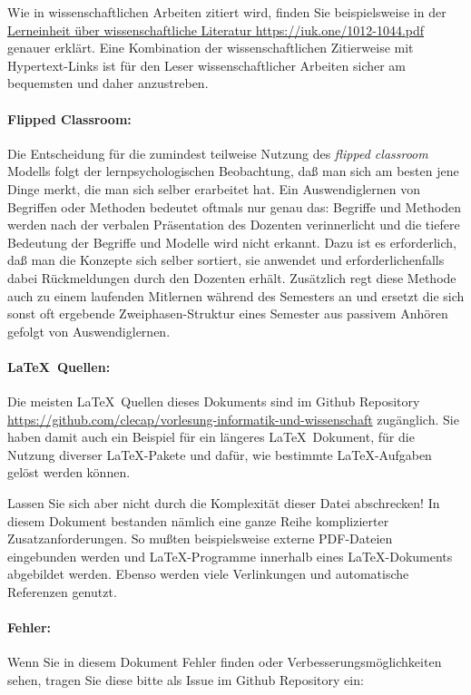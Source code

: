 \documentclass[a4paper]{article}%
\begin{document}
Wie in wissenschaftlichen Arbeiten zitiert wird, finden Sie beispielsweise in der
\href{https://iuk.one/1012-1044.pdf}{Lerneinheit über wissenschaftliche Literatur https://iuk.one/1012-1044.pdf} genauer erklärt.
Eine Kombination der wissenschaftlichen Zitierweise mit Hypertext-Links 
ist für den Leser wissenschaftlicher Arbeiten sicher am bequemsten und daher anzustreben.

\paragraph{Flipped Classroom:} Die Entscheidung für die zumindest teilweise Nutzung des
\textit{flipped classroom} Modells folgt der lernpsychologischen Beobachtung, daß
man sich am besten jene Dinge merkt, die man sich selber erarbeitet hat. 
Ein Auswendiglernen von Begriffen oder Methoden bedeutet oftmals nur genau das: Begriffe und
Methoden werden nach der verbalen Präsentation des Dozenten verinnerlicht und die tiefere
Bedeutung der Begriffe und Modelle wird nicht erkannt. Dazu ist es erforderlich, daß man
die Konzepte sich selber sortiert, sie anwendet und erforderlichenfalls dabei
Rückmeldungen durch den Dozenten erhält. Zusätzlich regt diese Methode auch zu einem
laufenden Mitlernen während des Semesters an und ersetzt die sich sonst oft ergebende
Zweiphasen-Struktur eines Semester aus passivem Anhören gefolgt von Auswendiglernen.

\paragraph{\LaTeX\ Quellen:} Die meisten \LaTeX\ Quellen dieses Dokuments sind im
Github Repository \url{https://github.com/clecap/vorlesung-informatik-und-wissenschaft} zugänglich.
Sie haben damit auch ein Beispiel für ein längeres \LaTeX\ Dokument,
für die Nutzung diverser \LaTeX-Pakete und dafür,
wie bestimmte \LaTeX-Aufgaben gelöst werden können.

Lassen Sie sich aber nicht durch die Komplexität dieser Datei abschrecken! In diesem Dokument
bestanden nämlich eine ganze Reihe komplizierter Zusatzanforderungen. So mußten
beispielsweise externe PDF-Dateien eingebunden werden und \LaTeX-Programme 
innerhalb eines \LaTeX-Dokuments abgebildet werden.
Ebenso werden viele Verlinkungen und automatische Referenzen genutzt.


\paragraph{Fehler:} Wenn Sie in diesem Dokument Fehler finden oder Verbesserungsmöglichkeiten sehen,
tragen Sie diese bitte als Issue im Github Repository ein:
\end{document}
